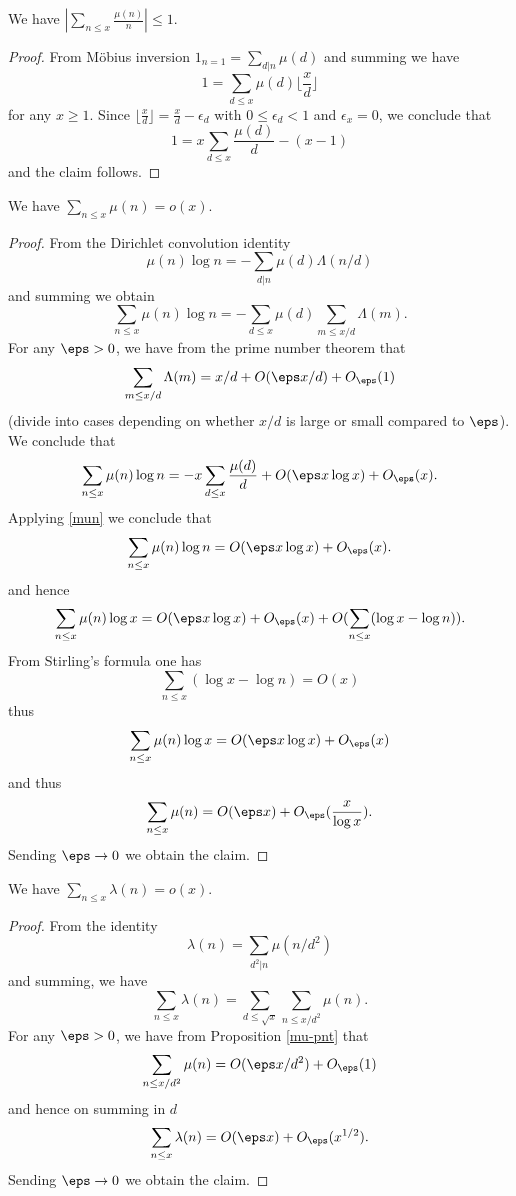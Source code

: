 \begin{proposition}\label{mun}\leanok
We have $|\sum_{n \leq x} \frac{\mu(n)}{n}| \leq 1$.
\end{proposition}


\begin{proof}
From M\"obius inversion $1_{n=1} = \sum_{d|n} \mu(d)$ and summing we have
  $$ 1 = \sum_{d \leq x} \mu(d) \lfloor \frac{x}{d} \rfloor$$
  for any $x \geq 1$. Since $\lfloor \frac{x}{d} \rfloor = \frac{x}{d} - \epsilon_d$ with
  $0 \leq \epsilon_d < 1$ and $\epsilon_x = 0$, we conclude that
  $$ 1 = x \sum_{d \leq x} \frac{\mu(d)}{d} - (x - 1)$$
  and the claim follows.
\end{proof}


\begin{proposition}\label{mu-pnt}\leanok  We have $\sum_{n \leq x} \mu(n) = o(x)$.
\end{proposition}


\begin{proof}
From the Dirichlet convolution identity
  $$ \mu(n) \log n = - \sum_{d|n} \mu(d) \Lambda(n/d)$$
and summing we obtain
$$ \sum_{n \leq x} \mu(n) \log n = - \sum_{d \leq x} \mu(d) \sum_{m \leq x/d} \Lambda(m).$$
For any $\eps>0$, we have from the prime number theorem that
$$ \sum_{m \leq x/d} \Lambda(m) = x/d + O(\eps x/d) + O_\eps(1)$$
(divide into cases depending on whether $x/d$ is large or small compared to $\eps$).
We conclude that
$$ \sum_{n \leq x} \mu(n) \log n = - x \sum_{d \leq x} \frac{\mu(d)}{d} + O(\eps x \log x) + O_\eps(x).$$
Applying \eqref{mun} we conclude that
$$ \sum_{n \leq x} \mu(n) \log n = O(\eps x \log x) + O_\eps(x).$$
and hence
$$ \sum_{n \leq x} \mu(n) \log x = O(\eps x \log x) + O_\eps(x) + O( \sum_{n \leq x} (\log x - \log n) ).$$
From Stirling's formula one has
$$  \sum_{n \leq x} (\log x - \log n) = O(x)$$
thus
$$ \sum_{n \leq x} \mu(n) \log x = O(\eps x \log x) + O_\eps(x)$$
and thus
$$ \sum_{n \leq x} \mu(n) = O(\eps x) + O_\eps(\frac{x}{\log x}).$$
Sending $\eps \to 0$ we obtain the claim.
\end{proof}


\begin{proposition}\label{lambda-pnt}\leanok
We have $\sum_{n \leq x} \lambda(n) = o(x)$.
\end{proposition}


\begin{proof}
From the identity
  $$ \lambda(n) = \sum_{d^2|n} \mu(n/d^2)$$
and summing, we have
$$ \sum_{n \leq x} \lambda(n) = \sum_{d \leq \sqrt{x}} \sum_{n \leq x/d^2} \mu(n).$$
For any $\eps>0$, we have from Proposition \ref{mu-pnt} that
$$ \sum_{n \leq x/d^2} \mu(n) = O(\eps x/d^2) + O_\eps(1)$$
and hence on summing in $d$
$$ \sum_{n \leq x} \lambda(n) = O(\eps x) + O_\eps(x^{1/2}).$$
Sending $\eps \to 0$ we obtain the claim.
\end{proof}


